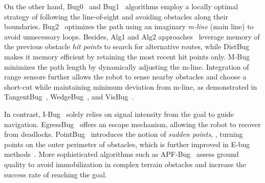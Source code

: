 


On the other hand, Bug0~\cite{lumelsky1986dynamic} and Bug1~\cite{lumelsky1987path} algorithms employ a locally optimal strategy of following the line-of-sight and avoiding obstacles along their boundaries. Bug2~\cite{lumelsky1987path} optimizes the path using an imaginary \emph{m-line} (main line) to avoid unnecessary loops. Besides, Alg1 and Alg2 approaches~\cite{sankaranarayanan1990new} leverage memory of the previous obstacle \emph{hit points} to search for alternative routes, while DistBug~\cite{kamon1997sensory} makes it memory efficient by retaining the most recent hit points only. M-Bug~\cite{mohsen2019new} minimizes the path length by dynamically adjusting the {m-line}. Integration of range sensors further allows the robot to sense nearby obstacles and choose a short-cut while maintaining minimum deviation from m-line, as demonstrated in TangentBug~\cite{kamon1996new}, WedgeBug~\cite{laubach1999autonomous}, and VisBug~\cite{lumelsky1990incorporating}.





In contrast, I-Bug~\cite{taylor2009bug} solely relies on signal intensity from the goal to guide navigation. EgressBug~\cite{guruprasad2012egressbug} offers an escape mechanism, allowing the robot to recover from deadlocks. PointBug~\cite{buniyamin2011simple} introduces the notion of \emph{sudden points}, \ie, turning points on the outer perimeter of obstacles, which is further improved in E-bug methods~\cite{Meddah2015ebug,mistri2022automated}. More sophisticated algorithms such as APF-Bug~\cite{wyrkabkiewicz2020local} assess ground quality to avoid immobilization in complex terrain obstacles and increase the success rate of reaching the goal.

